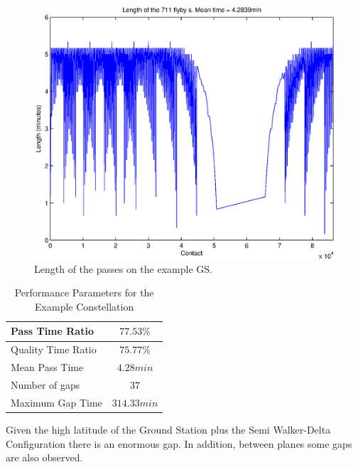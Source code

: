\begin{figure}[H]
\begin{center}
\includegraphics[scale=0.8]{LengthPass}
\caption{Length of the passes on the example GS.}
\end{center}
\end{figure}

\begin{table}[H]
\centering
\begin{tabular}{|l|c|}
\hline
Pass Time Ratio & $77.53\% $ \\ \hline
Quality Time Ratio     & $ 75.77\% $   \\ \hline
Mean Pass Time   & $ 4.28 min $ \\ \hline
Number of gaps  	 & $37$   \\ \hline
Maximum Gap Time   & $ 314.33 min $   \\ \hline
\end{tabular}
\caption{Performance Parameters for the Example Constellation}
\end{table}

Given the high latitude of the Ground Station plus the Semi Walker-Delta Configuration there is an enormous gap. In addition, between planes some gaps are also observed.